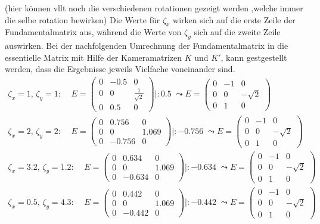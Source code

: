 (hier können vllt noch die verschiedenen rotationen gezeigt werden ,welche immer die selbe rotation bewirken)
Die Werte für $\zeta_x$ wirken sich auf die erste Zeile der Fundamentalmatrix aus, während die Werte von $\zeta_y$ sich auf die zweite Zeile auswirken. Bei der nachfolgenden Umrechnung der Fundamentalmatrix in die essentielle Matrix mit Hilfe der Kameramatrizen $K$ und $K'$, kann gestgestellt werden, dass die Ergebnisse jeweils Vielfache voneinander sind. \\


\begin{gather*}
		\zeta_x = 1, \, \zeta_y = 1: \; \; \;\;
	E = \begin{pmatrix}
		0&-0.5&0\\
		0&0&\frac{1}{\sqrt{2}}\\
		0&0.5&0
	\end{pmatrix} |: 0.5 \; \leadsto
E = \begin{pmatrix}
	0&-1&0\\
	0&0&-\sqrt{2}\\
	0&1&0
\end{pmatrix}\\
		\zeta_x = 2, \, \zeta_y = 2: \; \; \;\;
E = \begin{pmatrix}
	0&0.756&0\\
	0&0&1.069\\
	0&-0.756&0
\end{pmatrix} |: -0.756 \; \leadsto
E = \begin{pmatrix}
	0&-1&0\\
	0&0&-\sqrt{2}\\
	0&1&0
\end{pmatrix}\\
		\zeta_x = 3.2, \, \zeta_y = 1.2: \; \; \;\;
E = \begin{pmatrix}
	0&0.634&0\\
	0&0&1.069\\
	0&-0.634&0
\end{pmatrix} |: -0.634 \; \leadsto
E = \begin{pmatrix}
	0&-1&0\\
	0&0&-\sqrt{2}\\
	0&1&0
\end{pmatrix}\\
		\zeta_x = 0.5, \, \zeta_y = 4.3: \; \; \;\;
E = \begin{pmatrix}
	0&0.442&0\\
	0&0&1.069\\
	0&-0.442&0
\end{pmatrix} |: -0.442 \; \leadsto
E = \begin{pmatrix}
	0&-1&0\\
	0&0&-\sqrt{2}\\
	0&1&0
\end{pmatrix}\\
\end{gather*}

